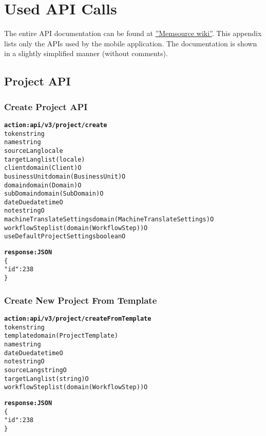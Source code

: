 \chapter{Used API Calls}
The entire API documentation can be found at \href{http://wiki.memsource.com/wiki/Memsource_API#API_Reference}{''Memsource wiki''}. This appendix lists only the APIs used by the mobile application. The documentation is shown in a slightly simplified manner (without comments).

\section{Project API}

\subsection{Create Project API}

\begin{alltt}
\textbf{action: api/v3/project/create}
token                       string
name                        string                             
sourceLang                  locale
targetLang                  list(locale)
client                      domain(Client)                     O
businessUnit                domain(BusinessUnit)               O
domain                      domain(Domain)                     O
subDomain                   domain(SubDomain)                  O
dateDue                     datetime                           O
note                        string                             O
machineTranslateSettings    domain(MachineTranslateSettings)   O
workflowStep                list(domain(WorkflowStep))         O
useDefaultProjectSettings   boolean                            O

\textbf{response: JSON}
\{
	"id": 238                
\}
\end{alltt}


\subsection{Create New Project From Template}
\begin{alltt}
\textbf{action: api/v3/project/createFromTemplate}
token                       string
template                    domain(ProjectTemplate)
name                        string                             
dateDue                     datetime                           O
note                        string                             O
sourceLang                  string                             O
targetLang                  list(string)                       O
workflowStep                list(domain(WorkflowStep))         O

\textbf{response: JSON}
\{
	"id": 238                 
\}
\end{alltt}

